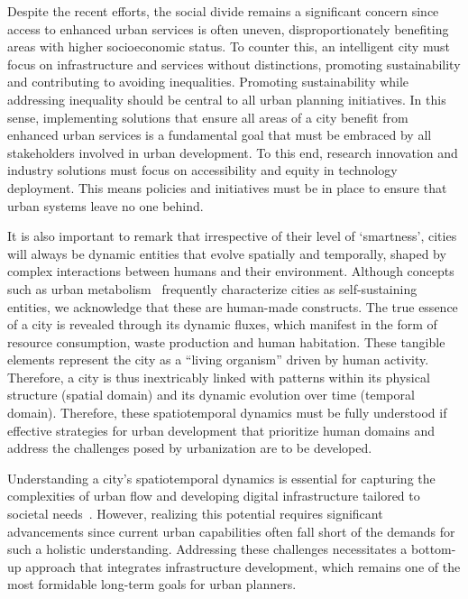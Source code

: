 \documentclass[smartcities,article,submit,pdftex,moreauthors]{Definitions/mdpi}
\begin{document}
Despite the recent efforts, the social divide remains a significant concern since access to enhanced urban services is often uneven, disproportionately benefiting areas with higher socioeconomic status. To counter this, an intelligent city must focus on infrastructure and services without distinctions, promoting sustainability and contributing to avoiding inequalities. Promoting sustainability while addressing inequality should be central to all urban planning initiatives. In this sense, implementing solutions that ensure all areas of a city benefit from enhanced urban services is a fundamental goal that must be embraced by all stakeholders involved in urban development. To this end, research innovation and industry solutions must focus on accessibility and equity in technology deployment. This means policies and initiatives must be in place to ensure that urban systems leave no one behind.

It is also important to remark that irrespective of their level of `smartness', cities will always be dynamic entities that evolve spatially and temporally, shaped by complex interactions between humans and their environment. Although concepts such as urban metabolism~\cite{KavitiMusango2020} frequently characterize cities as self-sustaining entities, we acknowledge that these are human-made constructs. The true essence of a city is revealed through its dynamic fluxes, which manifest in the form of resource consumption, waste production and human habitation. These tangible elements represent the city as a ``living organism'' driven by human activity. Therefore, a city is thus inextricably linked with patterns within its physical structure (spatial domain) and its dynamic evolution over time (temporal domain). Therefore, these spatiotemporal dynamics must be fully understood if effective strategies for urban development that prioritize human domains and address the challenges posed by urbanization are to be developed.

Understanding a city's spatiotemporal dynamics is essential for capturing the complexities of urban flow and developing digital infrastructure tailored to societal needs~\cite{bittencourtDatadrivenClusteringApproach2024}. However, realizing this potential requires significant advancements since current urban capabilities often fall short of the demands for such a holistic understanding. Addressing these challenges necessitates a bottom-up approach that integrates infrastructure development, which remains one of the most formidable long-term goals for urban planners.
\end{document}
